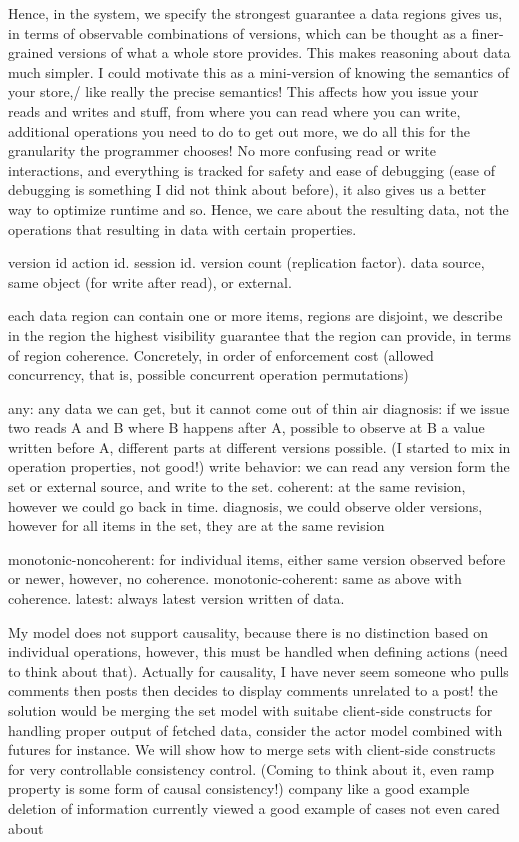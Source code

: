 \documentclass[preprint, numbers]{sigplanconf}
\begin{document}
Hence, in the system, we specify the strongest guarantee a data regions gives
us, in terms of observable combinations of versions, which can be thought as a
finer-grained versions of what a whole store provides. This makes reasoning about data much simpler.
I could motivate this as a mini-version of knowing the semantics of your store,/
like really the precise semantics! This affects how you issue your reads and
writes and stuff, from where you can read where you can write, additional
operations you need to do to get out more, we do all this for the granularity
the programmer chooses! No more confusing read or write interactions, and
everything is tracked for safety and ease of debugging (ease of debugging is
something I did not think about before), it also gives us a better way to
optimize runtime and so. Hence, we care about the resulting data, not the
operations that resulting in data with certain properties.


version id 
action id.
session id.
version count (replication factor).
data source, same object (for write after read), or external.

each data region can contain one or more items, regions are disjoint, we
describe in the region the highest visibility guarantee that the region can
provide, in terms of region coherence. Concretely, in order of enforcement cost
(allowed concurrency, that is, possible concurrent operation permutations)

any: any data we can get, but it cannot come out of thin air
diagnosis: if we issue two reads A and B where B happens after A, possible to observe at B a value written
before A, different parts at different versions possible. (I started to mix in operation properties, not good!)
write behavior: we can read any version form the set or external source, and
write to the set.
coherent: at the same revision, however we could go back in time.
diagnosis, we could observe older versions, however for all items in the set,
they are at the same revision

monotonic-noncoherent: for individual items, either same version observed before
or newer, however, no coherence. 
monotonic-coherent: same as above with coherence.
latest: always latest version written of data.

My model does not support causality, because there is no distinction based on
individual operations, however, this must be handled when defining actions (need
to think about that). Actually for causality, I have never seem someone who
pulls comments then posts then decides to display comments unrelated to a post!
the solution would be merging the set model with suitabe client-side constructs
for handling proper output of fetched data, consider the actor model combined
with futures for instance. We will show how to merge sets with client-side
constructs for very controllable consistency control.
(Coming to think about it, even ramp property is some form of causal
consistency!) 
company like a good example
deletion of information currently viewed a good example of cases not even cared
about
\end{document}
